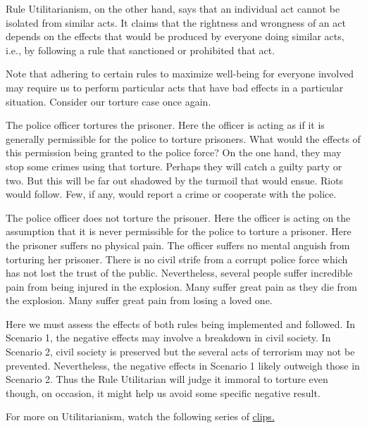 \documentclass[9pt]{article}
\begin{document}
Rule Utilitarianism, on the other hand, says that an individual act
cannot be isolated from similar acts. It claims that the rightness and
wrongness of an act depends on the effects that would be produced by
everyone doing similar acts, i.e., by following a rule that sanctioned
or prohibited that act.

Note that adhering to certain rules to maximize well-being for everyone
involved may require us to perform particular acts that have bad effects
in a particular situation. Consider our torture case once again.

\begin{description}
\itemsep1pt\parskip0pt
\item[Scenario 1]
The police officer tortures the prisoner. Here the officer is acting as
if it is generally permissible for the police to torture prisoners. What
would the effects of this permission being granted to the police force?
On the one hand, they may stop some crimes using that torture. Perhaps
they will catch a guilty party or two. But this will be far out shadowed
by the turmoil that would ensue. Riots would follow. Few, if any, would
report a crime or cooperate with the police.
\item[Scenario 2]
The police officer does not torture the prisoner. Here the officer is
acting on the assumption that it is never permissible for the police to
torture a prisoner. Here the prisoner suffers no physical pain. The
officer suffers no mental anguish from torturing her prisoner. There is
no civil strife from a corrupt police force which has not lost the trust
of the public. Nevertheless, several people suffer incredible pain from
being injured in the explosion. Many suffer great pain as they die from
the explosion. Many suffer great pain from losing a loved one.
\end{description}

Here we must assess the effects of both rules being implemented and
followed. In Scenario 1, the negative effects may involve a breakdown in
civil society. In Scenario 2, civil society is preserved but the several
acts of terrorism may not be prevented. Nevertheless, the negative
effects in Scenario 1 likely outweigh those in Scenario 2. Thus the Rule
Utilitarian will judge it immoral to torture even though, on occasion,
it might help us avoid some specific negative result.

For more on Utilitarianism, watch the following series of
\href{https://www.youtube.com/watch?v=uvmz5E75ZIA\&list=PLtKNX4SfKpzWiiUdXS9MKf8bgUfQSOlas}{clips.}
\end{document}
